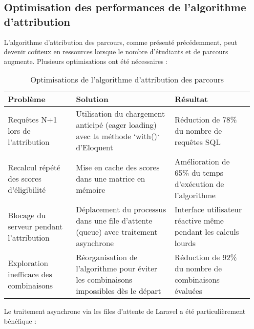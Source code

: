 \documentclass[french,12pt]{report} %
\begin{document}
\subsection{Optimisation des performances de l'algorithme d'attribution}

L'algorithme d'attribution des parcours, comme présenté précédemment, peut devenir coûteux en ressources lorsque le nombre d'étudiants et de parcours augmente. Plusieurs optimisations ont été nécessaires :

\begin{table}[H]
\centering
\begin{tabular}{|p{4cm}|p{4cm}|p{4.5cm}|}
\hline
\textbf{Problème} & \textbf{Solution} & \textbf{Résultat} \\ \hline
\hline
Requêtes N+1 lors de l'attribution & Utilisation du chargement anticipé (eager loading) avec la méthode `with()` d'Eloquent & Réduction de 78\% du nombre de requêtes SQL \\ \hline
Recalcul répété des scores d'éligibilité & Mise en cache des scores dans une matrice en mémoire & Amélioration de 65\% du temps d'exécution de l'algorithme \\ \hline
Blocage du serveur pendant l'attribution & Déplacement du processus dans une file d'attente (queue) avec traitement asynchrone & Interface utilisateur réactive même pendant les calculs lourds \\ \hline
Exploration inefficace des combinaisons & Réorganisation de l'algorithme pour éviter les combinaisons impossibles dès le départ & Réduction de 92\% du nombre de combinaisons évaluées \\ \hline
\end{tabular}
\caption{Optimisations de l'algorithme d'attribution des parcours}
\label{table:algorithm-optimization}
\end{table}

Le traitement asynchrone via les files d'attente de Laravel a été particulièrement bénéfique :
\end{document}
